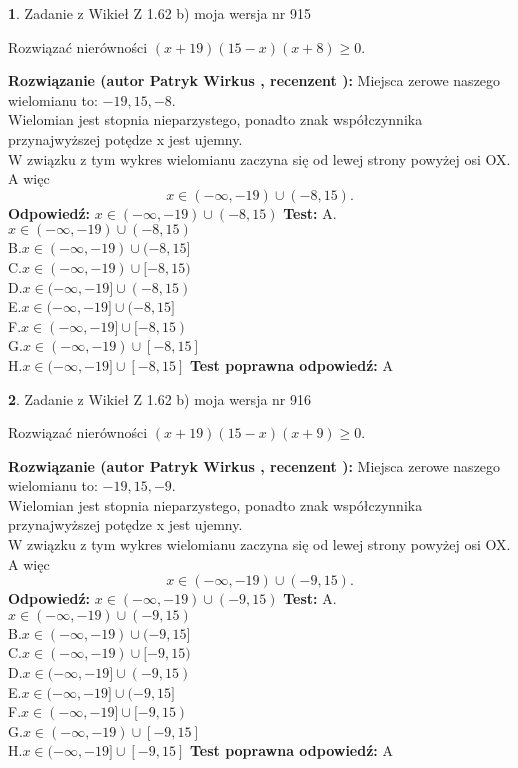 \documentclass[12pt, a4paper]{article}
\theoremstyle{definition} %
\newtheorem{zad}{}
\newcommand{\zadStart}[1]{\begin{zad}#1\newline}
\newcommand{\zadStop}{\end{zad}}
\newcommand{\rozwStart}[2]{\noindent \textbf{Rozwiązanie (autor #1 , recenzent #2): }\newline}
\newcommand{\rozwStop}{\newline}
\newcommand{\odpStart}{\noindent \textbf{Odpowiedź:}\newline}
\newcommand{\odpStop}{\newline}
\newcommand{\testStart}{\noindent \textbf{Test:}\newline}
\newcommand{\testStop}{\newline}
\newcommand{\kluczStart}{\noindent \textbf{Test poprawna odpowiedź:}\newline}
\newcommand{\kluczStop}{\newline}
\begin{document}
\zadStart{Zadanie z Wikieł Z 1.62 b) moja wersja nr 915}

Rozwiązać nierówności $(x+19)(15-x)(x+8)\ge0$.
\zadStop
\rozwStart{Patryk Wirkus}{}
Miejsca zerowe naszego wielomianu to: $-19, 15, -8$.\\
Wielomian jest stopnia nieparzystego, ponadto znak współczynnika przy\linebreak najwyższej potędze x jest ujemny.\\ W związku z tym wykres wielomianu zaczyna się od lewej strony powyżej osi OX. A więc $$x \in (-\infty,-19) \cup (-8,15).$$
\rozwStop
\odpStart
$x \in (-\infty,-19) \cup (-8,15)$
\odpStop
\testStart
A.$x \in (-\infty,-19) \cup (-8,15)$\\
B.$x \in (-\infty,-19) \cup (-8,15]$\\
C.$x \in (-\infty,-19) \cup [-8,15)$\\
D.$x \in (-\infty,-19] \cup (-8,15)$\\
E.$x \in (-\infty,-19] \cup (-8,15]$\\
F.$x \in (-\infty,-19] \cup [-8,15)$\\
G.$x \in (-\infty,-19) \cup [-8,15]$\\
H.$x \in (-\infty,-19] \cup [-8,15]$
\testStop
\kluczStart
A
\kluczStop



\zadStart{Zadanie z Wikieł Z 1.62 b) moja wersja nr 916}

Rozwiązać nierówności $(x+19)(15-x)(x+9)\ge0$.
\zadStop
\rozwStart{Patryk Wirkus}{}
Miejsca zerowe naszego wielomianu to: $-19, 15, -9$.\\
Wielomian jest stopnia nieparzystego, ponadto znak współczynnika przy\linebreak najwyższej potędze x jest ujemny.\\ W związku z tym wykres wielomianu zaczyna się od lewej strony powyżej osi OX. A więc $$x \in (-\infty,-19) \cup (-9,15).$$
\rozwStop
\odpStart
$x \in (-\infty,-19) \cup (-9,15)$
\odpStop
\testStart
A.$x \in (-\infty,-19) \cup (-9,15)$\\
B.$x \in (-\infty,-19) \cup (-9,15]$\\
C.$x \in (-\infty,-19) \cup [-9,15)$\\
D.$x \in (-\infty,-19] \cup (-9,15)$\\
E.$x \in (-\infty,-19] \cup (-9,15]$\\
F.$x \in (-\infty,-19] \cup [-9,15)$\\
G.$x \in (-\infty,-19) \cup [-9,15]$\\
H.$x \in (-\infty,-19] \cup [-9,15]$
\testStop
\kluczStart
A
\kluczStop
\end{document}
